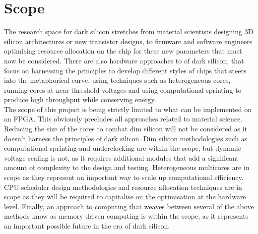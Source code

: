 \section{Scope}
	The research space for dark silicon stretches from material scientists designing 3D silicon architectures or new transistor designs, to firmware and software engineers optimising resource allocation on the chip for these new parameters that must now be considered. There are also hardware approaches to of dark silicon, that focus on harnessing the principles to develop different styles of chips that steers into the metaphorical curve, using techniques such as heterogeneous cores, running cores at near threshold voltages and using computational sprinting to produce high throughput while conserving energy.\\ 
	The scope of this project is being strictly limited to what can be implemented on an FPGA. This obviously precludes all approaches related to material science. Reducing the size of the cores to combat dim silicon will not be considered as it doesn’t harness the principles of dark silicon. Dim silicon methodologies such as computational sprinting and underclocking are within the scope, but dynamic voltage scaling is not, as it requires additional modules that add a significant amount of complexity to the design and testing. Heterogeneous multicores are in scope as they represent an important way to scale up computational efficiency. CPU scheduler design methodologies and resource allocation techniques are in scope as they will be required to capitalise on the optimisation at the hardware level. Finally, an approach to computing that weaves between several of the above methods know as memory driven computing is within the scope, as it represents an important possible future in the era of dark silicon.

